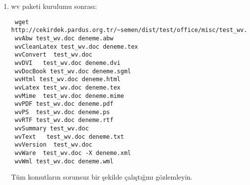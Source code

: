 \documentclass[a4paper,10pt]{article}
\begin{document}
\begin{enumerate}
\item wv paketi kurulumu sonrası:
\begin{verbatim}
 wget http://cekirdek.pardus.org.tr/~semen/dist/test/office/misc/test_wv.doc
 wvAbw test_wv.doc deneme.abw                                
 wvCleanLatex test_wv.doc deneme.tex                            
 wvConvert  test_wv.doc                              
 wvDVI   test_wv.doc deneme.dvi                                
 wvDocBook test_wv.doc deneme.sgml                               
 wvHtml test_wv.doc deneme.html                                 
 wvLatex test_wv.doc deneme.tex                                
 wvMime  test_wv.doc deneme.mime                                
 wvPDF test_wv.doc deneme.pdf                                  
 wvPS  test_wv.doc deneme.ps                                  
 wvRTF test_wv.doc deneme.rtf                                  
 wvSummary test_wv.doc            
 wvText   test_wv.doc deneme.txt                               
 wvVersion  test_wv.doc                             
 wvWare  test_wv.doc -X deneme.xml                                
 wvWml test_wv.doc deneme.wml       

\end{verbatim}

Tüm komutların sorunsuz bir şekilde çalıştığını gözlemleyin.


\end{enumerate}
\end{document}
